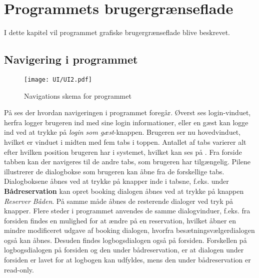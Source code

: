 \chapter{Programmets brugergrænseflade}


I dette kapitel vil programmet grafiske brugergrænseflade blive beskrevet.


\section{Navigering i programmet}

\begin{figure}[H]
\hspace*{-2cm}
\texttt{[image: UI/UI2.pdf]}
\vspace{-310pt}
\caption{Navigations skema for programmet}
\label{img:programNavigation}
\vspace{-20pt}
\end{figure}

På  ses der hvordan navigeringen i programmet foregår.
Øverst ses login-vinduet, herfra logger brugeren ind med sine login informationer, eller en gæst kan logge ind ved at trykke på \textit{login som gæst}-knappen.
Brugeren ser nu hovedvinduet, hvilket er vinduet i midten med fem tabs i toppen.
Antallet af tabs varierer alt efter hvilken position brugeren har i systemet, hvilket kan ses på . 
Fra forside tabben kan der navigeres til de andre tabs, som brugeren har tilgængelig.
Pilene illustrerer de dialogbokse som brugeren kan åbne fra de forskellige tabs.
Dialogboksene åbnes ved at trykke på knapper inde i tabsne, f.eks. under  \textbf{Bådreservation} kan opret booking dialogen åbnes ved at trykke på knappen \textit{Reserver Båden}. 
På samme måde åbnes de resterende dialoger ved tryk på knapper.
Flere steder i programmet anvendes de samme dialogvinduer, f.eks. fra forsiden findes en mulighed for at ændre på en reservation, hvilket åbner en mindre modificeret udgave af booking dialogen, hvorfra besætningsvælgerdialogen også kan åbnes.
Desuden findes logbogsdialogen også på forsiden.
Forskellen på logbogsdialogen på forsiden og den under bådreservation, er at dialogen under forsiden er lavet for at logbogen kan udfyldes, mens den under bådreservation er read-only.



